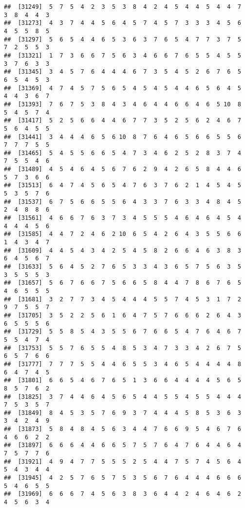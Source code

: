 \documentclass[
]{book}
\begin{document}
\begin{verbatim}
##  [31249]  5  7  5  4  2  3  5  3  8  4  2  4  5  4  4  5  4  4  7  3  8  4  4  3
##  [31273]  4  3  7  4  4  5  6  4  5  7  4  5  7  3  3  3  4  5  6  4  5  5  8  5
##  [31297]  5  6  5  4  4  6  5  3  6  3  7  6  5  4  7  7  3  7  5  7  2  5  5  3
##  [31321]  1  7  3  6  6  7  5  6  3  4  6  6  7  6  5  5  4  5  5  3  7  6  3  3
##  [31345]  3  4  5  7  6  4  4  4  6  7  3  5  4  5  2  6  7  6  5  6  5  4  5  3
##  [31369]  4  7  4  5  7  5  6  5  4  5  4  5  4  4  6  5  6  4  5  4  4  3  6  7
##  [31393]  7  6  7  5  3  8  4  3  4  6  4  4  6  6  4  6  5 10  8  5  4  5  7  4
##  [31417]  5  2  5  6  6  4  4  6  7  7  3  5  2  5  6  2  4  6  7  5  6  4  5  5
##  [31441]  3  4  4  4  6  5  6 10  8  7  6  4  6  5  6  6  5  5  6  7  7  7  5  5
##  [31465]  5  4  5  5  6  6  5  4  7  3  4  6  2  5  2  8  3  7  4  7  5  5  4  6
##  [31489]  4  5  4  6  4  5  6  7  6  2  9  4  2  6  5  8  4  4  6  5  7  3  6  6
##  [31513]  6  4  7  4  5  6  5  4  7  6  3  7  6  2  1  4  5  4  5  5  3  5  7  6
##  [31537]  6  7  5  6  6  5  5  6  4  3  3  7  6  3  3  4  8  4  5  2  4  8  8  6
##  [31561]  4  6  6  7  6  3  7  3  4  5  5  5  4  6  4  6  4  5  4  4  4  4  5  6
##  [31585]  4  4  7  2  4  6  2 10  6  5  4  2  6  4  3  5  5  6  6  1  4  3  4  7
##  [31609]  4  4  5  4  3  4  2  5  4  5  8  2  6  6  4  6  3  8  3  6  4  5  6  7
##  [31633]  5  6  4  5  2  7  6  5  3  3  4  3  6  5  7  5  6  3  5  3  5  5  5  3
##  [31657]  5  6  7  6  6  7  5  6  6  5  8  4  4  7  8  6  7  6  5  4  6  5  5  5
##  [31681]  3  2  7  7  3  4  5  4  4  4  5  5  7  4  5  3  1  7  2  9  7  5  5  7
##  [31705]  3  5  2  2  5  6  1  6  4  7  5  7  6  6  6  2  6  4  3  6  5  5  5  6
##  [31729]  5  5  8  5  4  3  5  5  6  7  6  6  5  4  7  6  4  6  7  5  5  4  7  4
##  [31753]  5  5  7  6  5  5  4  8  5  3  4  7  3  3  4  2  6  7  5  6  5  7  6  6
##  [31777]  7  7  7  5  5  4  4  6  5  5  3  4  6  5  4  4  4  4  8  6  4  7  4  5
##  [31801]  6  6  5  4  6  7  6  5  1  3  6  6  4  4  4  4  5  6  5  8  5  7  6  2
##  [31825]  3  7  4  4  6  4  5  6  5  4  4  5  5  4  5  5  4  4  4  7  5  3  5  7
##  [31849]  8  4  5  3  5  7  6  9  3  7  4  4  4  5  8  5  3  6  3  3  4  2  4  9
##  [31873]  5  8  4  8  4  5  6  3  4  4  7  6  6  9  5  4  6  7  6  4  6  6  2  2
##  [31897]  6  6  6  4  4  6  6  5  7  5  7  6  4  7  6  4  4  6  4  7  5  7  7  6
##  [31921]  4  9  4  7  7  5  5  5  2  5  4  4  7  5  7  4  5  6  4  5  4  3  4  4
##  [31945]  4  2  5  7  6  5  7  5  3  5  6  7  6  4  4  4  6  6  6  5  4  6  5  5
##  [31969]  6  6  6  7  4  5  6  3  8  3  6  4  4  2  4  6  4  6  2  4  5  6  3  4

\end{verbatim}
\end{document}
